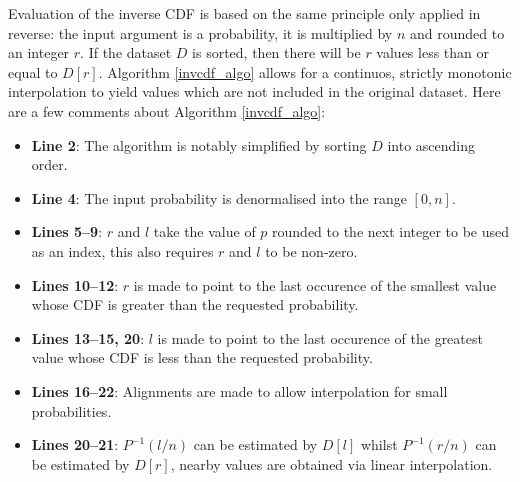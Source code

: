 \documentclass[10pt,final]{siamltex}
\begin{document}
Evaluation of the inverse CDF is based on the same principle only applied in reverse: the input argument is a probability, it is multiplied by $n$ and rounded to an integer $r$. If the dataset $D$ is sorted, then there will be $r$ values less than or equal to $D[r]$. Algorithm \ref{invcdf_algo} allows for a continuos, strictly monotonic interpolation to yield values which are not included in the original dataset.
Here are a few comments about Algorithm \ref{invcdf_algo}:
\begin{itemize}
  \item \textbf{Line 2}: The algorithm is notably simplified by sorting $D$ into ascending order.
  \item \textbf{Line 4}: The input probability is denormalised into the range $[0, n]$.
  \item \textbf{Lines 5--9}: $r$ and $l$ take the value of $p$ rounded to the next integer to be used as an index, this also requires $r$ and $l$ to be non-zero.
  \item \textbf{Lines 10--12}: $r$ is made to point to the last occurence of the smallest value whose CDF is greater than the requested probability.
  \item \textbf{Lines 13--15, 20}: $l$ is made to point to the last occurence of the greatest value whose CDF is less than the requested probability.
  \item \textbf{Lines 16--22}: Alignments are made to allow interpolation for small probabilities.
  \item \textbf{Lines 20--21}: $P^{-1}(l/n)$ can be estimated by $D[l]$ whilst $P^{-1}(r/n)$ can be estimated by $D[r]$, nearby values are obtained via linear interpolation.
\end{itemize}
%
\end{document}
